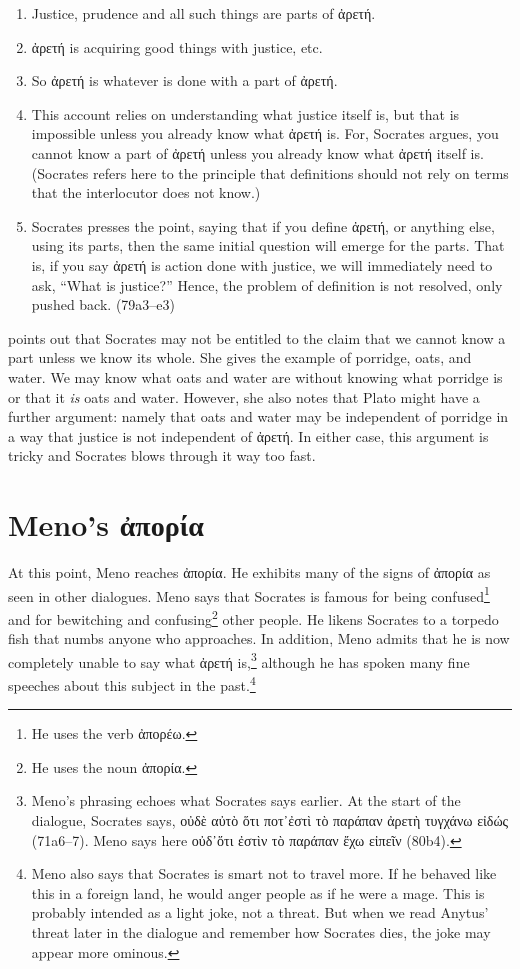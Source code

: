 \documentclass[11pt]{article}
\begin{document}
\begin{enumerate}
    \item Justice, prudence and all such things are parts of {\g ἀρετή}.
    \item {\g ἀρετή} is acquiring good things with justice, etc.
    \item So {\g ἀρετή} is whatever is done with a part of {\g ἀρετή}.
    \item This account relies on understanding what justice itself is, but that is impossible unless you already know what {\g ἀρετή} is. For, Socrates argues, you cannot know a part of {\g ἀρετή} unless you already know what {\g ἀρετή} itself is. (Socrates refers here to the principle that definitions should not rely on terms that the interlocutor does not know.)
    \item Socrates presses the point, saying that if you define {\g ἀρετή}, or anything else, using its parts, then the same initial question will emerge for the parts. That is, if you say {\g ἀρετή} is action done with justice, we will immediately need to ask, ``What is justice?'' Hence, the problem of definition is not resolved, only pushed back. (79a3--e3)
\end{enumerate}

\citet[59]{fine2014} points out that Socrates may not be entitled to the claim that we cannot know a part unless we know its whole. She gives the example of porridge, oats, and water. We may know what oats and water are without knowing what porridge is or that it \emph{is} oats and water. However, she also notes that Plato might have a further argument: namely that oats and water may be independent of porridge in a way that justice is not independent of {\g ἀρετή}. In either case, this argument is tricky and Socrates blows through it way too fast.  

\section{Meno's {\g ἀπορία}}

At this point, Meno reaches {\g ἀπορία}. He exhibits many of the signs of {\g ἀπορία} as seen in other dialogues. Meno says that Socrates is famous for being confused\footnote{He uses the verb {\g ἀπορέω}.} and for bewitching and confusing\footnote{He uses the noun {\g ἀπορία}.} other people. He likens Socrates to a torpedo fish that numbs anyone who approaches. In addition, Meno admits that he is now completely unable to say what {\g ἀρετή} is,\footnote{Meno's phrasing echoes what Socrates says earlier. At the start of the dialogue, Socrates says, {\g οὐδὲ αὐτὸ ὅτι ποτ᾽ἐστὶ τὸ παράπαν ἀρετὴ τυγχάνω εἰδώς} (71a6--7). Meno says here {\g οὐδ᾽ὅτι ἐστὶν τὸ παράπαν ἔχω εἰπεῖν} (80b4).} although he has spoken many fine speeches about this subject in the past.\footnote{Meno also says that Socrates is smart not to travel more. If he behaved like this in a foreign land, he would anger people as if he were a mage. This is probably intended as a light joke, not a threat. But when we read Anytus' threat later in the dialogue and remember how Socrates dies, the joke may appear more ominous.}
\end{document}
